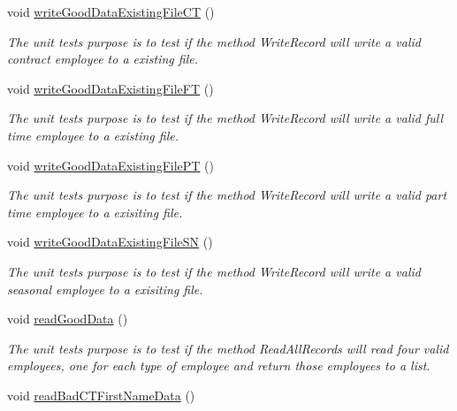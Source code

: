 \begin{DoxyCompactItemize}
void \hyperlink{class_file_i_o_tests_1_1_file_i_o_tests_ad39e7e6da79929bc94d459fdbd4e67db}{write\+Good\+Data\+Existing\+File\+C\+T} ()
\begin{DoxyCompactList}\small\item\em The unit test\textquotesingle{}s purpose is to test if the method Write\+Record will write a valid contract employee to a existing file. \end{DoxyCompactList}\item 
void \hyperlink{class_file_i_o_tests_1_1_file_i_o_tests_ac8692223bba5d32d6671b8d20e57a5a1}{write\+Good\+Data\+Existing\+File\+F\+T} ()
\begin{DoxyCompactList}\small\item\em The unit test\textquotesingle{}s purpose is to test if the method Write\+Record will write a valid full time employee to a existing file. \end{DoxyCompactList}\item 
void \hyperlink{class_file_i_o_tests_1_1_file_i_o_tests_ac1b4e455917b40938344801e8463038a}{write\+Good\+Data\+Existing\+File\+P\+T} ()
\begin{DoxyCompactList}\small\item\em The unit test\textquotesingle{}s purpose is to test if the method Write\+Record will write a valid part time employee to a exisiting file. \end{DoxyCompactList}\item 
void \hyperlink{class_file_i_o_tests_1_1_file_i_o_tests_a03e8b6ab0681621f1dbb85fd66ace4bd}{write\+Good\+Data\+Existing\+File\+S\+N} ()
\begin{DoxyCompactList}\small\item\em The unit test\textquotesingle{}s purpose is to test if the method Write\+Record will write a valid seasonal employee to a exisiting file. \end{DoxyCompactList}\item 
void \hyperlink{class_file_i_o_tests_1_1_file_i_o_tests_acfe0df2ca6406249ebfe55e37dd6e162}{read\+Good\+Data} ()
\begin{DoxyCompactList}\small\item\em The unit test\textquotesingle{}s purpose is to test if the method Read\+All\+Records will read four valid employees, one for each type of employee and return those employees to a list. \end{DoxyCompactList}\item 
void \hyperlink{class_file_i_o_tests_1_1_file_i_o_tests_aa4b0c4cad279bedd3e72f95f6e2a8e37}{read\+Bad\+C\+T\+First\+Name\+Data} ()

\end{DoxyCompactItemize}
